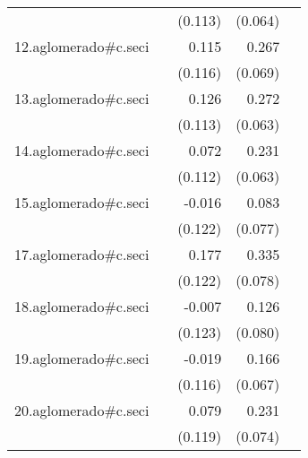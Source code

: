 {\begin{longtable}{l*{4}{D{.}{.}{-1}}}
            &                     &     (0.113)         &     (0.064)         &                     \\
\addlinespace
12.aglomerado#c.seci&                     &       0.115         &       0.267\sym{***}&                     \\
            &                     &     (0.116)         &     (0.069)         &                     \\
\addlinespace
13.aglomerado#c.seci&                     &       0.126         &       0.272\sym{***}&                     \\
            &                     &     (0.113)         &     (0.063)         &                     \\
\addlinespace
14.aglomerado#c.seci&                     &       0.072         &       0.231\sym{***}&                     \\
            &                     &     (0.112)         &     (0.063)         &                     \\
\addlinespace
15.aglomerado#c.seci&                     &      -0.016         &       0.083         &                     \\
            &                     &     (0.122)         &     (0.077)         &                     \\
\addlinespace
17.aglomerado#c.seci&                     &       0.177         &       0.335\sym{***}&                     \\
            &                     &     (0.122)         &     (0.078)         &                     \\
\addlinespace
18.aglomerado#c.seci&                     &      -0.007         &       0.126         &                     \\
            &                     &     (0.123)         &     (0.080)         &                     \\
\addlinespace
19.aglomerado#c.seci&                     &      -0.019         &       0.166\sym{*}  &                     \\
            &                     &     (0.116)         &     (0.067)         &                     \\
\addlinespace
20.aglomerado#c.seci&                     &       0.079         &       0.231\sym{**} &                     \\
            &                     &     (0.119)         &     (0.074)         &                     \\

\end{longtable}}
